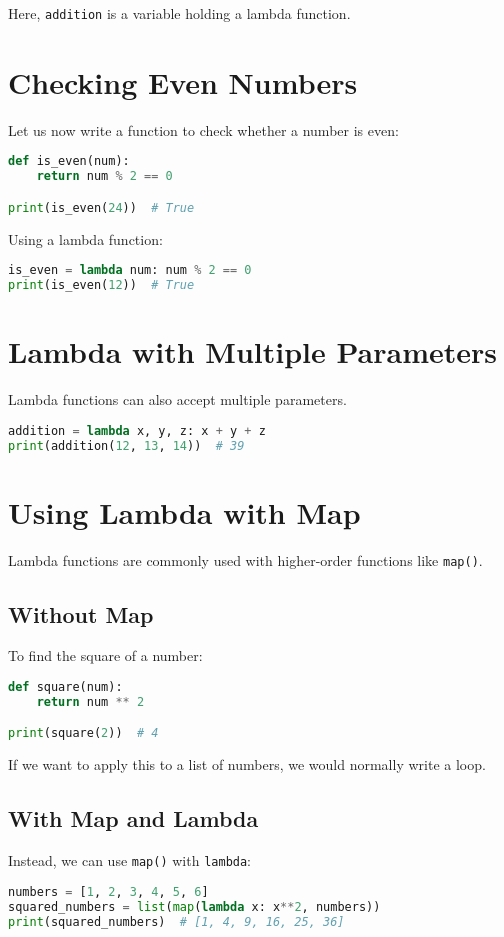 Here, \texttt{addition} is a variable holding a lambda function.

\section{Checking Even Numbers}
Let us now write a function to check whether a number is even:
\begin{lstlisting}[language=Python, caption={Even check using a normal function}]
def is_even(num):
    return num % 2 == 0

print(is_even(24))  # True
\end{lstlisting}

Using a lambda function:
\begin{lstlisting}[language=Python, caption={Even check using lambda}]
is_even = lambda num: num % 2 == 0
print(is_even(12))  # True
\end{lstlisting}

\section{Lambda with Multiple Parameters}
Lambda functions can also accept multiple parameters.

\begin{lstlisting}[language=Python, caption={Addition with three parameters}]
addition = lambda x, y, z: x + y + z
print(addition(12, 13, 14))  # 39
\end{lstlisting}

\section{Using Lambda with Map}
Lambda functions are commonly used with higher-order functions like \texttt{map()}.

\subsection{Without Map}
To find the square of a number:
\begin{lstlisting}[language=Python, caption={Square function}]
def square(num):
    return num ** 2

print(square(2))  # 4
\end{lstlisting}

If we want to apply this to a list of numbers, we would normally write a loop.

\subsection{With Map and Lambda}
Instead, we can use \texttt{map()} with \texttt{lambda}:
\begin{lstlisting}[language=Python, caption={Using map with lambda}]
numbers = [1, 2, 3, 4, 5, 6]
squared_numbers = list(map(lambda x: x**2, numbers))
print(squared_numbers)  # [1, 4, 9, 16, 25, 36]
\end{lstlisting}

